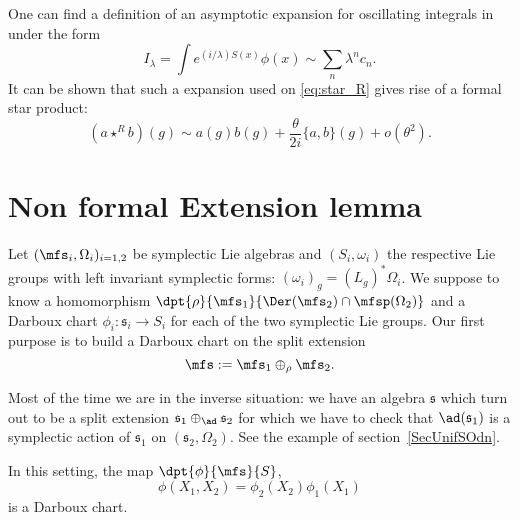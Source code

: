 One can  find a definition of an asymptotic expansion for oscillating integrals in \cite{Dieu7} under the form
\[
   I_{\lambda}=\int e^{(i/\lambda)S(x)}\phi(x)\sim\sum_n\lambda^nc_n.
\]
It can be shown that such a  expansion used on \eqref{eq:star_R} gives rise of a formal star product:
\begin{equation}    \label{EqDevFedFor}
(a\star^{R} b)(g)\sim a(g)b(g)+\frac{\theta}{2i}\{a,b\}(g)+o(\theta^2).
\end{equation}

\section{Non formal Extension lemma}        \label{SecExtLem}

Let $(\mfs_i,\Omega_i)_{i=1,2}$ be  symplectic Lie algebras and $(S_i,\omega_i)$ the respective Lie groups with left invariant symplectic forms: $(\omega_i)_g=(L_g)^*\Omega_i$.
We suppose to know a homomorphism  $\dpt{\rho}{\mfs_1}{\Der(\mfs_2)\cap\mfsp(\Omega_2)}$ and a Darboux chart $\phi_i\colon \mathfrak{s}_i\to S_i$ for each of the two symplectic Lie groups. Our first purpose is to build a Darboux chart on the split extension
\[
   \mfs:=\mfs_1\oplus_{\rho}\mfs_2.
\]

\begin{remark}
Most of the time we are in the inverse situation: we have an algebra $\mathfrak{s}$ which turn out to be a split extension $\mathfrak{s}_{1}\oplus_{\ad}\mathfrak{s}_{2}$ for which we have to check that $\ad(\mathfrak{s}_{1})$ is a symplectic action of $\mathfrak{s}_{1}$ on $(\mathfrak{s}_{2},\Omega_{2})$. See the example of section~\ref{SecUnifSOdn}.
\end{remark}

\begin{proposition}
In this setting, the map $\dpt{\phi}{\mfs}{S}$,
\begin{equation}
  \phi(X_1,X_2)=\phi_2(X_2)\phi_1(X_1)
\end{equation}
is a Darboux chart.
\label{prop:Darboux}
\end{proposition}

